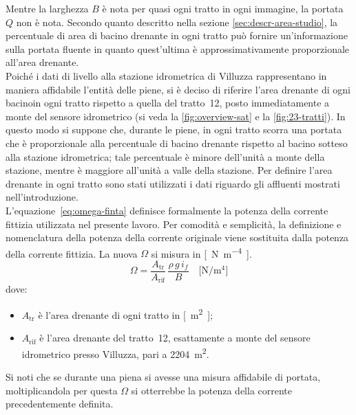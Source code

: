 Mentre la larghezza $B$ è nota per quasi ogni tratto in ogni immagine, la portata $Q$ non è nota.
Secondo quanto descritto nella sezione \ref{sec:descr-area-studio}, la percentuale di area di bacino drenante in ogni tratto può fornire un'informazione sulla portata fluente in quanto quest'ultima è approssimativamente proporzionale all'area drenante.
\\
Poiché i dati di livello alla stazione idrometrica di Villuzza rappresentano in maniera affidabile l'entità delle piene, si è deciso di riferire l'area drenante di ogni bacinoin ogni tratto rispetto a quella del tratto~12, posto immediatamente a monte del sensore idrometrico (si veda la \cref{fig:overview-sat} e la \cref{fig:23-tratti}).
In questo modo si suppone che, durante le piene, in ogni tratto scorra una portata che è proporzionale alla percentuale di bacino drenante rispetto al bacino sotteso alla stazione idrometrica; tale percentuale è minore dell’unità a monte della stazione, mentre è maggiore all’unità a valle della stazione.
Per definire l’area drenante in ogni tratto sono stati utilizzati i dati riguardo gli affluenti mostrati nell’introduzione.
\\
L'equazione~\eqref{eq:omega-finta} definisce formalmente la potenza della corrente fittizia utilizzata nel presente lavoro.
Per comodità e semplicità, la definizione e nomenclatura della potenza della corrente originale viene sostituita dalla potenza della corrente fittizia.
La nuova $\Omega$ si misura in \si{[\newton\per\m\tothe{4}]}.
%
\begin{equation}
	\label{eq:omega-finta}
	\Omega = \frac{A_\mathrm{tr}}{A_\mathrm{rif}} \, \frac{\rho \, g \, i_f}{B}	
	\quad
	\si{[\newton\per\m\tothe{4}]} 
\end{equation}
%
dove:
%
\begin{itemize}
	\item $A_\mathrm{tr}$ è l'area drenante di ogni tratto in \si{[\m\tothe{2}]};
	\item $A_\mathrm{rif}$ è l'area drenante del tratto~12, esattamente a monte del sensore idrometrico presso Villuzza, pari a \SI{2204}{\m\tothe{2}}.
\end{itemize}
%
Si noti che se durante una piena si avesse una misura affidabile di portata, moltiplicandola per questa $\Omega$ si otterrebbe la potenza della corrente precedentemente definita.
